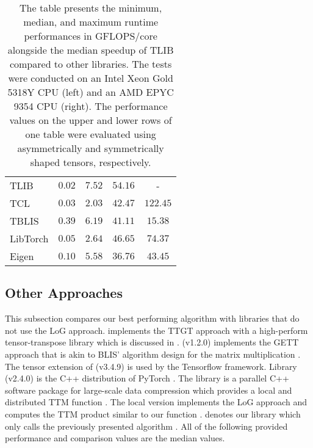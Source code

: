 \begin{table*}[t]
\begin{tabular}{lccc c}
		\midrule
		TLIB       & $0.02$  & $\mathbf{7.52}$  & $\mathbf{54.16}$ &  -  \\
		TCL        & $0.03$  & $2.03$    & $42.47$ & $122.45$     \\
		TBLIS      & $\mathbf{0.39}$  & $6.19$    & $41.11$ & $15.38$     \\
		LibTorch   & $0.05$  & $2.64$    & $46.65$ & $74.37$     \\
		Eigen      & $0.10$  & $5.58$    & $36.76$ & $43.45$     \\
		\bottomrule
	\end{tabular}
	\caption%
	{%
		\footnotesize
		The table presents the minimum, median, and maximum runtime performances in GFLOPS/core alongside the median speedup of TLIB compared to other libraries.
		The tests were conducted on an Intel Xeon Gold 5318Y CPU (left) and an AMD EPYC 9354 CPU (right). 
		The performance values on the upper and lower rows of one table were evaluated using asymmetrically and symmetrically shaped tensors, respectively. 
	}
	\label{tab:comparison}
\end{table*}

\subsection{Other Approaches}
This subsection compares our best performing algorithm with libraries that do not use the LoG approach.
 implements the TTGT approach with a high-perform tensor-transpose library  which is discussed in \cite{springer:2018:design}.
 (v1.2.0) implements the GETT approach that is akin to BLIS' algorithm design for the matrix multiplication \cite{matthews:2018:high}.
The tensor extension of  (v3.4.9) is used by the Tensorflow framework.
Library  (v2.4.0) is the C++ distribution of PyTorch \cite{paszke:2019:pytorch}.
The  library is a parallel C++ software package for large-scale data compression which provides a local and distributed TTM function \cite{ballard:2020:tuckermpi}.
The local version implements the LoG approach and computes the TTM product similar to our function .
 denotes our library which only calls the previously presented algorithm .
All of the following provided performance and comparison values are the median values.


